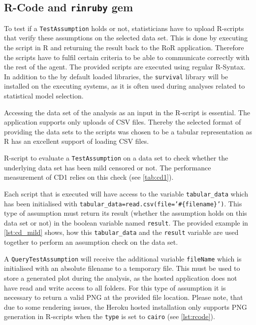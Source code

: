 \subsection{R-Code and \texttt{rinruby} gem}
\label{sec:r_code}

To test if a \texttt{TestAssumption} holds or not, statisticians have to upload \gls{R}-scripts that verify these assumptions on the selected data set. This is done by executing the script in \gls{R} and returning the result back to the \gls{RoR} application. Therefore the scripts have to fulfil certain criteria to be able to communicate correctly with the rest of the agent. The provided scripts are executed using regular R-Syntax. In addition to the by default loaded libraries, the \texttt{survival} library will be installed on the executing systems, as it is often used during analyses related to statistical model selection.

Accessing the data set of the analysis as an input in the R-script is essential. The application supports only uploads of CSV files. Thereby the selected format of providing the data sets to the scripts was chosen to be a tabular representation as \gls{R} has an excellent support of loading CSV files.

\begin{listing}[htbp]
	\caption{R-script to evaluate a \texttt{TestAssumption} on a data set to check whether the underlying data set has been mild censored or not. The performance measurement of CD1 relies on this check (see \autoref{tab:cd1}). }
	\label{lst:cd_mild}
\end{listing}


Each script that is executed will have access to the variable \texttt{tabular\_data} which has been initialised with \texttt{tabular\_data=read.csv(file='\#\{filename\}')}. This type of assumption must return its result (whether the assumption holds on this data set or not) in the boolean variable named \texttt{result}. The provided example in \cref{lst:cd_mild} shows, how this \texttt{tabular\_data} and the \texttt{result} variable are used together to perform an assumption check on the data set.

A \texttt{QueryTestAssumption} will receive the additional variable \texttt{fileName} which is initialised with an absolute filename to a temporary file. This must be used to store a generated plot during the analysis, as the hosted application does not have read and write access to all folders. For this type of assumption it is necessary to return a valid PNG at the provided file location. Please note, that due to some rendering issues, the Heroku hosted installation only supports PNG generation in R-scripts when the \texttt{type} is set to \texttt{cairo} (see \cref{lst:rcode}).


